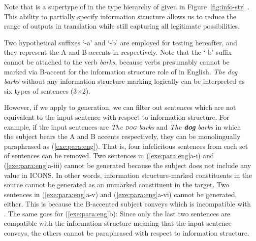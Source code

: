 \noindent Note that  is a supertype of
 in the type hierarchy of  given in
Figure~\ref{fig:info-str}
.  
This ability to partially specify information
structure allows us to reduce the range of outputs in translation
while still capturing all legitimate possibilities.



Two hypothetical suffixes `-a' and `-b' are employed for testing
hereafter, and they represent the A and B accents in 
\citep{bolinger:61,jackendoff:72} respectively.  Note that the `-b'
suffix cannot be attached to the verb \textit{barks}, because verbs
presumably cannot be marked via B-accent for the information
structure role of  in English.  \textit{The dog barks}
without any information structure marking logically can be interpreted
as six types of sentences (3\ensuremath{\times}2).






\noindent However, if we apply  to generation, we can
filter out sentences which are not equivalent to the input sentence
with respect to information structure. For example, if the input
sentences are \textit{The \textsc{dog} barks} and \textit{The
  \textbf{dog} barks} in which the subject bears the A and B accents
respectively, they can be monolingually paraphrased as
(\ref{exe:para:eng}). That is, four infelicitous sentences from each
set of sentences can be removed.  Two sentences in
(\ref{exe:para:eng}a-i) and (\ref{exe:para:eng}a-iii) cannot be
generated because the subject does not include any value in ICONS. In
other words, information structure-marked constituents in the source
cannot be generated as an unmarked constituent in the target.  Two
sentences in (\ref{exe:para:eng}a-v) and (\ref{exe:para:eng}a-vi)
cannot be generated, either. This is because the
B-accented subject conveys  which is
incompatible with .
The same goes for (\ref{exe:para:eng}b): Since only the last two sentences are
compatible with the information structure meaning that the input
sentence conveys, the others cannot be paraphrased with respect to
information structure.





